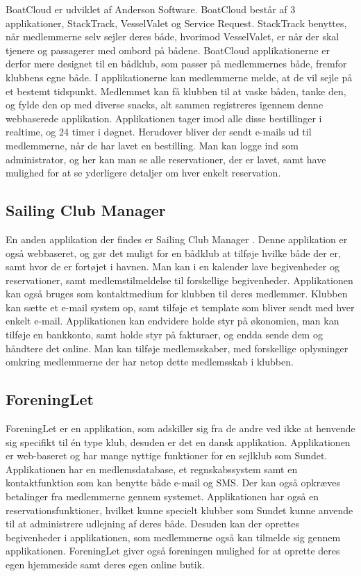 BoatCloud er udviklet af Anderson Software. \citep{BoatCloud} 
BoatCloud består af 3 applikationer, StackTrack, VesselValet og Service Request. 
StackTrack benyttes, når medlemmerne selv sejler deres både, hvorimod VesselValet, er når der skal tjenere og passagerer med ombord på bådene. 
BoatCloud applikationerne er derfor mere designet til
en bådklub, som passer på medlemmernes både, fremfor klubbens egne både. 
I applikationerne kan medlemmerne melde, at de vil sejle på et bestemt tidspunkt. 
Medlemmet kan få klubben til at vaske båden, tanke den, og
fylde den op med diverse snacks, alt sammen registreres igennem denne webbaserede applikation. 
Applikationen tager imod alle disse bestillinger i realtime, og 24 timer i døgnet. 
Herudover bliver der sendt e-mails ud til medlemmerne, når de har lavet en bestilling. 
Man kan logge ind som administrator, og her kan man se alle reservationer, der er lavet, samt have mulighed for at se yderligere detaljer om hver enkelt reservation.


\subsection*{Sailing Club Manager}

En anden applikation der findes er Sailing Club Manager \citep{SailClub}. 
Denne applikation er også webbaseret, og gør det muligt for en bådklub at tilføje hvilke både der er, samt hvor de er fortøjet i havnen. 
Man kan i en kalender lave begivenheder og reservationer, samt medlemstilmeldelse til forskellige begivenheder. Applikationen kan også bruges som kontaktmedium for klubben til deres medlemmer. 
Klubben kan sætte et e-mail system op, samt tilføje et template som bliver sendt med hver enkelt e-mail. Applikationen kan endvidere holde styr på økonomien, man kan tilføje en bankkonto, samt  holde styr på fakturaer, og endda sende dem og håndtere det online. 
Man kan tilføje medlemsskaber, med forskellige oplysninger omkring medlemmerne der har netop dette medlemsskab i klubben.

\subsection*{ForeningLet}

ForeningLet er en applikation, som adskiller sig fra de andre ved ikke at henvende sig specifikt til én type klub, desuden er det en dansk applikation. 
Applikationen er web-baseret og har mange nyttige funktioner for en sejlklub som Sundet. 
Applikationen har en medlemsdatabase, et regnskabssystem samt en kontaktfunktion som kan benytte både e-mail og SMS. 
Der kan også opkræves betalinger fra medlemmerne gennem systemet. 
Applikationen har også en reservationsfunktioner, hvilket kunne specielt klubber som Sundet kunne anvende til at administrere  udlejning af deres både. 
Desuden kan der oprettes begivenheder i applikationen, som medlemmerne også kan tilmelde sig gennem applikationen. ForeningLet giver også foreningen mulighed for at oprette deres egen hjemmeside samt deres egen online butik.


